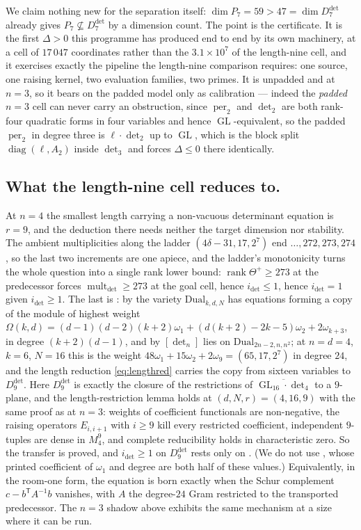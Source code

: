 \documentclass[11pt]{amsart}
\theoremstyle{plain}
\theoremstyle{definition}
\theoremstyle{remark}
\DeclareMathOperator{\GL}{GL}
\DeclareMathOperator{\mult}{mult}
\DeclareMathOperator{\per}{per}
\DeclareMathOperator{\rank}{rank}
\newcommand{\Pp}{P}
\newcommand{\Ddet}{D^{\det}}
\begin{document}
We claim nothing new for the separation itself: $\dim\Pp_7=59>47=\dim\Ddet_7$
already gives $\Pp_7\not\subseteq\Ddet_7$ by a dimension count.  The point is
the certificate.  It is the first $\Delta>0$ this programme has produced end to
end by its own machinery, at a cell of $17\,047$ coordinates rather than the
$3.1\times10^{7}$ of the length-nine cell, and it exercises exactly the pipeline
the length-nine comparison requires: one source, one raising kernel, two
evaluation families, two primes.  It is unpadded and at $n=3$, so it bears on the
padded model only as calibration --- indeed the \emph{padded} $n=3$ cell can
never carry an obstruction, since $\per_2$ and $\det_2$ are both rank-four
quadratic forms in four variables and hence $\GL$-equivalent, so the padded
$\per_2$ in degree three is $\ell\cdot\det_2$ up to $\GL$, which is the block
split $\operatorname{diag}(\ell,A_2)$ inside $\det_3$ and forces
$\Delta\le0$ there identically.

\subsection*{What the length-nine cell reduces to.}

At $n=4$ the smallest length carrying a non-vacuous determinant equation is
$r=9$, and the deduction there needs neither the target dimension nor
stability.  The ambient multiplicities along the ladder
$(4\delta-31,17,2^{7})$ end $\dots,272,273,274$, so the last two increments are
one apiece, and the ladder's monotonicity turns the whole question into a single
rank lower bound: $\rank\Theta^{+}\ge273$ at the predecessor forces
$\mult_{\det}\ge273$ at the goal cell, hence $i_{\det}\le1$, hence
$i_{\det}=1$ given $i_{\det}\ge1$.  The last is \cite{LMR}: by
\cite[Thm.~2.3.1]{LMR} the variety $\mathrm{Dual}_{k,d,N}$ has equations
forming a copy of the module of highest weight
$\Omega(k,d)=(d-1)(d-2)(k+2)\omega_1+(d(k+2)-2k-5)\omega_2+2\omega_{k+3}$, in
degree $(k+2)(d-1)$, and by \cite[Thm.~3.1.1]{LMR} $[\det_n]$ lies on
$\mathrm{Dual}_{2n-2,n,n^{2}}$; at $n=d=4$, $k=6$, $N=16$ this is the weight
$48\omega_1+15\omega_2+2\omega_9=(65,17,2^{7})$ in degree $24$, and the
length reduction \eqref{eq:lengthred} carries the copy from sixteen variables to
$\Ddet_9$.  Here $\Ddet_9$ is exactly the closure of the restrictions of
$\overline{\GL_{16}\cdot\det_4}$ to a $9$-plane, and the length-restriction lemma holds at
$(d,N,r)=(4,16,9)$ with the same proof as at $n=3$: weights of coefficient functionals are
non-negative, the raising operators $E_{i,i+1}$ with $i\ge9$ kill every restricted coefficient,
independent $9$-tuples are dense in $M_4^{9}$, and complete reducibility holds in characteristic zero.
So the transfer is proved, and $i_{\det}\ge1$ on $\Ddet_9$ rests only on \cite{LMR}.  (We do not
use \cite[Thm.~1.0.2]{LMR}, whose printed coefficient of $\omega_1$ and degree
are both half of these values.)  Equivalently, in the
room-one form, the equation is born exactly when the Schur complement
$c-b^{\mathsf T}A^{-1}b$ vanishes, with $A$ the degree-$24$ Gram restricted to
the transported predecessor.  The $n=3$ shadow above exhibits the same mechanism
at a size where it can be run.
\end{document}
